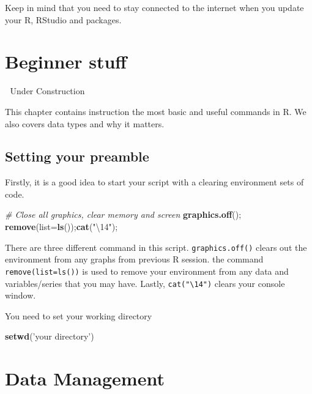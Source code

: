 \documentclass[
]{book}
\newenvironment{Shaded}{\begin{snugshade}}{\end{snugshade}}
\newcommand{\CommentTok}[1]{\textcolor[rgb]{0.56,0.35,0.01}{\textit{#1}}}
\newcommand{\DataTypeTok}[1]{\textcolor[rgb]{0.13,0.29,0.53}{#1}}
\newcommand{\KeywordTok}[1]{\textcolor[rgb]{0.13,0.29,0.53}{\textbf{#1}}}
\newcommand{\NormalTok}[1]{#1}
\newcommand{\StringTok}[1]{\textcolor[rgb]{0.31,0.60,0.02}{#1}}
\begin{document}
Keep in mind that you need to stay connected to the internet when you update your R, RStudio and packages.

\hypertarget{beginner-stuff}{%
\chapter{Beginner stuff}\label{beginner-stuff}}

🚧 Under Construction 🚧

This chapter contains instruction the most basic and useful commands in R. We also covers data types and why it matters.

\hypertarget{setting-your-preamble}{%
\section{Setting your preamble}\label{setting-your-preamble}}

Firstly, it is a good idea to start your script with a clearing environment sets of code.

\begin{Shaded}
\begin{Highlighting}[]
\CommentTok{# Close all graphics, clear memory and screen}
\KeywordTok{graphics.off}\NormalTok{(); }\KeywordTok{remove}\NormalTok{(}\DataTypeTok{list=}\KeywordTok{ls}\NormalTok{());}\KeywordTok{cat}\NormalTok{(}\StringTok{"\textbackslash{}14"}\NormalTok{);}
\end{Highlighting}
\end{Shaded}

There are three different command in this script. \texttt{graphics.off()} clears out the environment from any graphs from previous R session. the command \texttt{remove(list=ls())} is used to remove your environment from any data and variables/series that you may have. Lastly, \texttt{cat("\textbackslash{}14")} clears your console window.

You need to set your working directory

\begin{Shaded}
\begin{Highlighting}[]
\KeywordTok{setwd}\NormalTok{(}\StringTok{'your directory'}\NormalTok{)}
\end{Highlighting}
\end{Shaded}

\hypertarget{data-management}{%
\chapter{Data Management}\label{data-management}}
\end{document}
